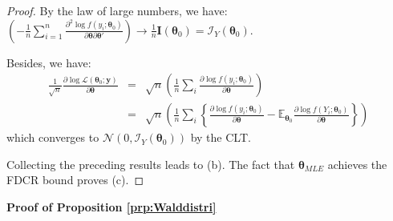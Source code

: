 \documentclass[
  12pt,
]{book}
\theoremstyle{definition}
\theoremstyle{definition}
\theoremstyle{definition}
\theoremstyle{definition}
\theoremstyle{remark}
\begin{document}
\begin{proof}
By the law of large numbers, we have: \(\left(- \frac{1}{n} \sum_{i=1}^n \frac{\partial^2 \log f(y_i;\boldsymbol\theta_0)}{\partial \boldsymbol\theta \partial \boldsymbol\theta'} \right) \overset{}\rightarrow \frac{1}{n} \mathbf{I}(\boldsymbol\theta_0) = \mathcal{I}_Y(\boldsymbol\theta_0)\).

Besides, we have:
\begin{eqnarray*}
\frac{1}{\sqrt{n}} \frac{\partial \log \mathcal{L}(\boldsymbol\theta_0;\mathbf{y})}{\partial \boldsymbol\theta} &=& \sqrt{n} \left( \frac{1}{n} \sum_i \frac{\partial \log f(y_i;\boldsymbol\theta_0)}{\partial \boldsymbol\theta} \right) \\
&=& \sqrt{n} \left( \frac{1}{n} \sum_i \left\{ \frac{\partial \log f(y_i;\boldsymbol\theta_0)}{\partial \boldsymbol\theta} - \mathbb{E}_{\boldsymbol\theta_0} \frac{\partial \log f(Y_i;\boldsymbol\theta_0)}{\partial \boldsymbol\theta} \right\} \right)
\end{eqnarray*}
which converges to \(\mathcal{N}(0,\mathcal{I}_Y(\boldsymbol\theta_0))\) by the CLT.

Collecting the preceding results leads to (b). The fact that \(\boldsymbol\theta_{MLE}\) achieves the FDCR bound proves (c).
\end{proof}

\textbf{Proof of Proposition \ref{prp:Walddistri}}
\end{document}
